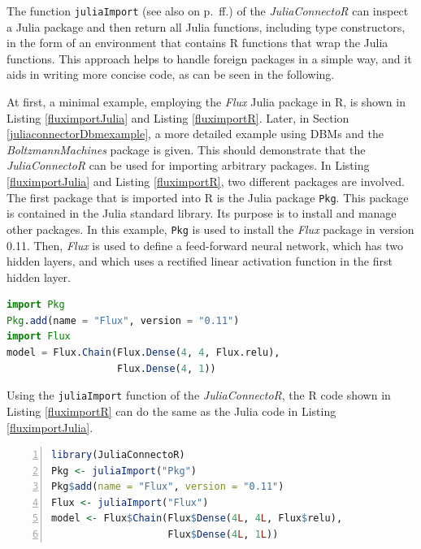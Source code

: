 \documentclass[12pt]{article}
\newcommand{\inlinecode}[1]{\texttt{#1}}
\newcommand{\apkg}[1]{\emph{#1}}
\begin{document}
The function \inlinecode{juliaImport} (see also on p.~\pageref{rdokitem_juliaImport}ff.) of the \apkg{JuliaConnectoR} can inspect a Julia package and then return all Julia functions, including type constructors, in the form of an environment that contains R functions that wrap the Julia functions.
This approach helps to handle foreign packages in a simple way, and it aids in writing more concise code, as can be seen in the following.

At first, a minimal example, employing the \apkg{Flux} Julia package in R, is shown in Listing \ref{fluximportJulia} and Listing \ref{fluximportR}.
Later, in Section \ref{juliaconnectorDbmexample}, a more detailed example using DBMs and the \apkg{BoltzmannMachines} package is given.
This should demonstrate that the \apkg{JuliaConnectoR} can be used for importing arbitrary packages.
In Listing \ref{fluximportJulia} and Listing \ref{fluximportR}, two different packages are involved.
The first package that is imported into R is the Julia package \inlinecode{Pkg}.
This package is contained in the Julia standard library.
Its purpose is to install and manage other packages.
In this example, \inlinecode{Pkg} is used to install the \apkg{Flux} package in version 0.11.
Then, \apkg{Flux} is used to define a feed-forward neural network, which has two hidden layers, and which uses a rectified linear activation function in the first hidden layer.


\begin{lstlisting}[language=Julia,float=!h,caption={Julia code for importing the \apkg{Flux} package and defining a small neural network},label={fluximportJulia}]
import Pkg
Pkg.add(name = "Flux", version = "0.11")
import Flux
model = Flux.Chain(Flux.Dense(4, 4, Flux.relu), 
                   Flux.Dense(4, 1))
\end{lstlisting}

Using the \inlinecode{juliaImport} function of the \apkg{JuliaConnectoR}, the R code shown in Listing \ref{fluximportR} can do the same as the Julia code in Listing \ref{fluximportJulia}.

\begin{lstlisting}[language=R,numbers=left,float=!h,caption={R code using the \apkg{JuliaConnectoR} for  doing the same as in Listing \ref{fluximportJulia}},label={fluximportR}]
library(JuliaConnectoR)
Pkg <- juliaImport("Pkg")
Pkg$add(name = "Flux", version = "0.11")
Flux <- juliaImport("Flux")
model <- Flux$Chain(Flux$Dense(4L, 4L, Flux$relu),
                    Flux$Dense(4L, 1L))
\end{lstlisting}
\end{document}
